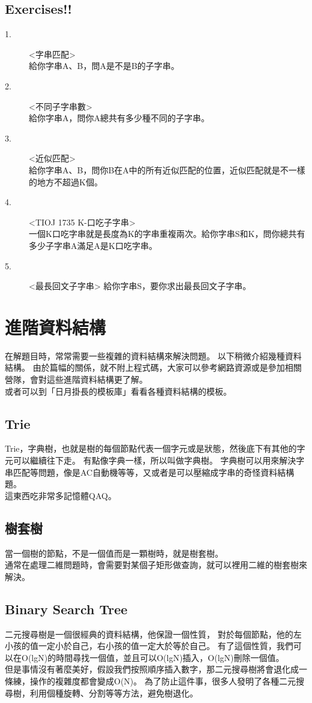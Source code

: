 \documentclass{article}
\begin{document}
\subsection{Exercises!!}
\begin{description}
\item[ 1.]<字串匹配>\\
給你字串A、B，問A是不是B的子字串。
\item[ 2.]<不同子字串數>\\
給你字串A，問你A總共有多少種不同的子字串。
\item[ 3.]<近似匹配>\\
給你字串A、B，問你B在A中的所有近似匹配的位置，近似匹配就是不一樣的地方不超過K個。
\item[ 4.]<TIOJ 1735 K-口吃子字串>\\
一個K口吃字串就是長度為K的字串重複兩次。給你字串S和K，問你總共有多少子字串A滿足A是K口吃字串。
\item[ 5.]<最長回文子字串>
給你字串S，要你求出最長回文子字串。
\end{description}


\section{進階資料結構}
在解題目時，常常需要一些複雜的資料結構來解決問題。
以下稍微介紹幾種資料結構。
由於篇幅的關係，就不附上程式碼，大家可以參考網路資源或是參加相關營隊，會對這些進階資料結構更了解。\\
或者可以到「日月掛長的模板庫」看看各種資料結構的模板。

\subsection{Trie}
Trie，字典樹，也就是樹的每個節點代表一個字元或是狀態，然後底下有其他的字元可以繼續往下走。
有點像字典一樣，所以叫做字典樹。
字典樹可以用來解決字串匹配等問題，像是AC自動機等等，又或者是可以壓縮成字串的奇怪資料結構題。\\
這東西吃非常多記憶體QAQ。

\subsection{樹套樹}
當一個樹的節點，不是一個值而是一顆樹時，就是樹套樹。\\
通常在處理二維問題時，會需要對某個子矩形做查詢，就可以裡用二維的樹套樹來解決。

\subsection{Binary Search Tree}
二元搜尋樹是一個很經典的資料結構，他保證一個性質，
對於每個節點，他的左小孩的值一定小於自己，右小孩的值一定大於等於自己。
有了這個性質，我們可以在O(lgN)的時間尋找一個值，並且可以O(lgN)插入，O(lgN)刪除一個值。\\
但是事情沒有著麼美好，假設我們按照順序插入數字，那二元搜尋樹將會退化成一條練，操作的複雜度都會變成O(N)。
為了防止這件事，很多人發明了各種二元搜尋樹，利用個種旋轉、分割等等方法，避免樹退化。
\end{document}
